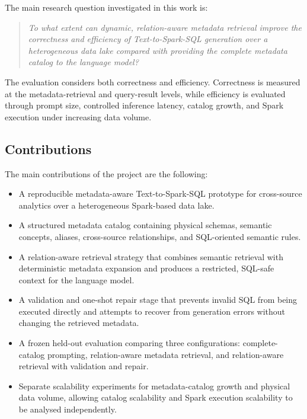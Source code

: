 The main research question investigated in this work is:

\begin{quote}
\emph{To what extent can dynamic, relation-aware metadata retrieval improve
the correctness and efficiency of Text-to-Spark-SQL generation over a
heterogeneous data lake compared with providing the complete metadata catalog
to the language model?}
\end{quote}

The evaluation considers both correctness and efficiency. Correctness is
measured at the metadata-retrieval and query-result levels, while efficiency is
evaluated through prompt size, controlled inference latency, catalog growth,
and Spark execution under increasing data volume.


\subsection{Contributions}

The main contributions of the project are the following:

\begin{itemize}

    \item A reproducible metadata-aware Text-to-Spark-SQL prototype for
    cross-source analytics over a heterogeneous Spark-based data lake.

    \item A structured metadata catalog containing physical schemas, semantic
    concepts, aliases, cross-source relationships, and SQL-oriented semantic
    rules.

    \item A relation-aware retrieval strategy that combines semantic retrieval
    with deterministic metadata expansion and produces a restricted,
    SQL-safe context for the language model.

    \item A validation and one-shot repair stage that prevents invalid SQL
    from being executed directly and attempts to recover from generation
    errors without changing the retrieved metadata.

    \item A frozen held-out evaluation comparing three configurations:
    complete-catalog prompting, relation-aware metadata retrieval, and
    relation-aware retrieval with validation and repair.

    \item Separate scalability experiments for metadata-catalog growth and
    physical data volume, allowing catalog scalability and Spark execution
    scalability to be analysed independently.

\end{itemize}


